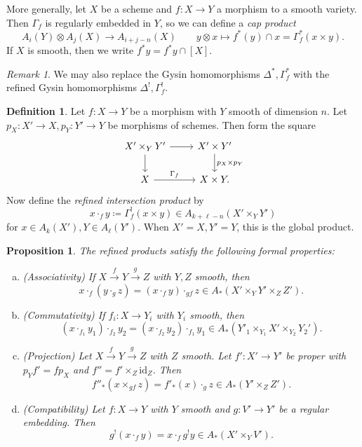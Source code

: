 \documentclass[leqno, openany]{memoir}
\newtheorem{prop}[thm]{Proposition}
\theoremstyle{definition}
\newtheorem{defn}[thm]{Definition}
\theoremstyle{remark}
\newtheorem{rmk}[thm]{Remark}
\theoremstyle{plain}
\theoremstyle{definition}
\theoremstyle{remark}
\newcommand{\mr}[1]{\mathrm{#1}}
\begin{document}
More generally, let $X$ be a scheme and $f \colon X \to Y$ a morphism to a smooth variety. Then $\Gamma_f$ is regularly embedded in $Y$, so we can define a \textit{cap product}
\[ A_i (Y) \otimes A_j (X) \to A_{i+j-n}(X) \qquad y \otimes x \mapsto f^*(y) \cap x = \Gamma_f^*(x \times y). \]
If $X$ is smooth, then we write $f^*y = f^* y \cap [X]$.

\begin{rmk}
    We may also replace the Gysin homomorphisms $\Delta^*, \Gamma_f^*$ with the refined Gysin homomorphisms $\Delta^{!}, \Gamma_f^{!}$.
\end{rmk}

\begin{defn}
    Let $f \colon X \to Y$ be a morphism with $Y$ smooth of dimension $n$. Let $p_X \colon X' \to X, p_Y \colon Y' \to Y$ be morphisms of schemes. Then form the square
    \begin{equation*}
    \begin{tikzcd}
        X' \times_Y Y' \ar{d} \ar{r} & X' \times Y' \ar{d}{p_X \times p_Y} \\
        X \ar{r}{\Gamma_f} & X \times Y.
    \end{tikzcd}
    \end{equation*}
    Now define the \textit{refined intersection product} by
    \[ x \cdot_f y \coloneqq \Gamma_f^{!} (x \times y) \in A_{k+\ell-n}(X' \times_Y Y') \]
    for $x \in A_k(X'), Y \in A_{\ell}(Y')$. When $X' = X, Y' = Y$, this is the global product.
\end{defn}

\begin{prop}
    The refined products satisfy the following formal properties:
    \begin{enumerate}[(a)]
        \item (Associativity) If $X \xrightarrow{f} Y \xrightarrow{g} Z$ with $Y, Z$ smooth, then 
            \[ x \cdot_f (y \cdot_g z) = (x \cdot_f y) \cdot_{gf} z \in A_*(X' \times_Y Y' \times_Z Z'). \]
        \item (Commutativity) If $f_i \colon X \to Y_i$ with $Y_i$ smooth, then
            \[ (x \cdot_{f_1} y_1) \cdot_{f_2} y_2 = (x \cdot_{f_2} y_2) \cdot_{f_1} y_1 \in A_*(Y'_1 \times_{Y_1} X' \times_{Y_2} Y_2'). \]
        \item (Projection) Let $X \xrightarrow{f} Y \xrightarrow{g} Z$ with $Z$ smooth. Let $f' \colon X' \to Y'$ be proper with $p_Y f' = f p_X$ and $f'' = f' \times_Z \mr{id}_Z$. Then
            \[ f''_* (x \times_{gf} z) = f'_*(x) \cdot_g z \in A_*(Y' \times_Z Z'). \]
        \item (Compatibility) Let $f \colon X \to Y$ with $Y$ smooth and $g \colon V' \to Y'$ be a regular embedding. Then 
            \[ g^{!}(x \cdot_f y) = x \cdot_f g^{!}y \in A_*(X' \times_Y V'). \]
    \end{enumerate}
\end{prop}
\end{document}
